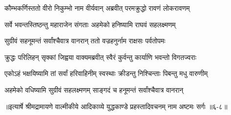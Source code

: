 \twolineshloka
{कौम्भकर्णिस्ततो वीरो निकुम्भो नाम वीर्यवान्}
{अब्रवीत् परमक्रुद्धो रावणं लोकरावणम्} %

\twolineshloka
{सर्वे भवन्तस्तिष्ठन्तु महाराजेन संगताः}
{अहमेको हनिष्यामि राघवं सहलक्ष्मणम्} %

\twolineshloka
{सुग्रीवं सहनूमन्तं सर्वांश्चैवात्र वानरान्}
{ततो वज्रहनुर्नाम राक्षसः पर्वतोपमः} %

\twolineshloka
{क्रुद्धः परिलिहन् सृक्कां जिह्वया वाक्यमब्रवीत्}
{स्वैरं कुर्वन्तु कार्याणि भवन्तो विगतज्वराः} %

\twolineshloka
{एकोऽहं भक्षयिष्यामि तां सर्वां हरिवाहिनीम्}
{स्वस्थाः क्रीडन्तु निश्चिन्ताः पिबन्तु मधु वारुणीम्} %

\twolineshloka
{अहमेको वधिष्यामि सुग्रीवं सहलक्ष्मणम्}
{साङ्गदं च हनूमन्तं सर्वांश्चैवात्र वानरान्} %


॥इत्यार्षे श्रीमद्रामायणे वाल्मीकीये आदिकाव्ये युद्धकाण्डे प्रहस्तादिवचनम् नाम अष्टमः सर्गः ॥६-८॥
